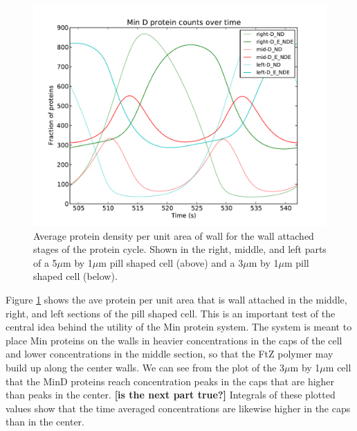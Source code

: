 \documentclass[letterpaper,twocolumn,amsmath,amssymb,pre]{revtex4-1}
\newcommand{\red}[1]{{\bf \color{red} #1}}
\newcommand{\fixme}[1]{\red{[#1]}}
\newcommand\micron{\ensuremath{\mu\text{m}}}
\begin{document}
\begin{figure}
  \includegraphics[width=\columnwidth]{../data/shape-p/plots/ave-plot_D--p-300-50-0-0-1500}
  \caption{Average protein density per unit area of wall for the wall
    attached stages of the protein cycle.  Shown in the right, middle,
    and left parts of a 5$\micron$ by 1$\micron$ pill shaped cell (above)
    and a 3$\micron$ by 1$\micron$ pill shaped cell (below).}
  \label{ave-per-area-plot-pill}
\end{figure}

Figure \ref{ave-per-area-plot-pill} shows the ave protein per unit
area that is wall attached in the middle, right, and left sections of
the pill shaped cell.  This is an important test of the central idea
behind the utility of the Min protein system.  The system is meant to
place Min proteins on the walls in heavier concentrations in the caps
of the cell and lower concentrations in the middle section, so that
the FtZ polymer may build up along the center walls.  We can see from
the plot of the 3$\micron$ by 1$\micron$ cell that the MinD proteins reach
concentration peaks in the caps that are higher than peaks in the
center.  \fixme{is the next part true?} Integrals of these plotted values show that the time averaged
concentrations are likewise higher in the caps than in the center.
\end{document}
